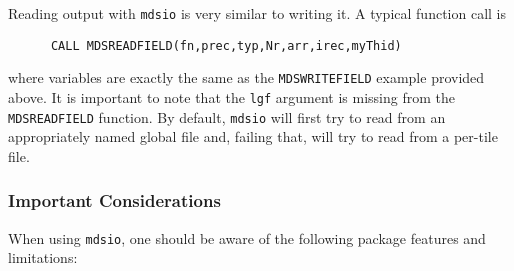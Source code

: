 Reading output with \texttt{mdsio} is very similar to writing it.  A
typical function call is
\begin{verbatim}
      CALL MDSREADFIELD(fn,prec,typ,Nr,arr,irec,myThid)
\end{verbatim}
where variables are exactly the same as the \texttt{MDSWRITEFIELD}
example provided above.  It is important to note that the \texttt{lgf}
argument is missing from the \texttt{MDSREADFIELD} function.  By
default, \texttt{mdsio} will first try to read from an appropriately
named global file and, failing that, will try to read from a per-tile
file.


\subsubsection{Important Considerations}
When using \texttt{mdsio}, one should be aware of the following
package features and limitations:
